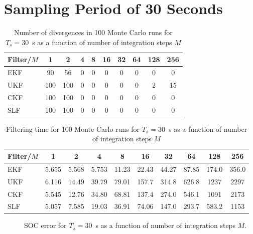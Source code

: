 \documentclass[../zhang_thesis.tex]{subfiles}
\begin{document}
\section{Sampling Period of 30 Seconds}

\begin{table}[h]
\centering
\caption{Number of divergences in 100 Monte Carlo runs for $T_s=30$~s as a function of number of integration steps $M$}
\begin{tabular}{@{}l*{9}{c}@{}}
\toprule
Filter/$M$ & 1   & 2   & 4 & 8 & 16 & 32 & 64 & 128 & 256 \\
\midrule
EKF        & 90  & 56  & 0 & 0 & 0  & 0  & 0  & 0   & 0   \\
UKF        & 100 & 100 & 0 & 0 & 0  & 0  & 0  & 2   & 15  \\
CKF        & 100 & 100 & 0 & 0 & 0  & 0  & 0  & 0   & 0   \\
SLF        & 100 & 100 & 0 & 0 & 0  & 0  & 0  & 0   & 0   \\
\bottomrule
\end{tabular}
\label{tab:div_30}
\end{table}

\begin{table}[h]
\centering
\caption{Filtering time for 100 Monte Carlo runs for $T_s=30$~s as a function of number of integration steps $M$}
\begin{tabular}{@{}lccccccccc@{}}
\toprule
Filter/$M$ & 1     & 2     & 4     & 8     & 16    & 32    & 64    & 128   & 256   \\ \midrule
EKF        & 5.655 & 5.568 & 5.753 & 11.23 & 22.43 & 44.27 & 87.85 & 174.0 & 356.0 \\
UKF        & 6.116 & 14.49 & 39.79 & 79.01 & 157.7 & 314.8 & 626.8 & 1237  & 2297  \\
CKF        & 5.545 & 12.76 & 34.80 & 68.81 & 137.4 & 274.0 & 546.1 & 1091  & 2173  \\
SLF        & 5.057 & 7.585 & 19.03 & 36.91 & 74.06 & 147.0 & 293.7 & 583.2 & 1153  \\ \bottomrule
\end{tabular}
\label{tab:time_30}
\end{table}

\clearpage

\begin{figure}[p]
\centering

\caption{SOC error for $T_s=30$~s as a function of number of integration steps $M$.}
\label{fig:mrmse_30}
\end{figure}
\end{document}

